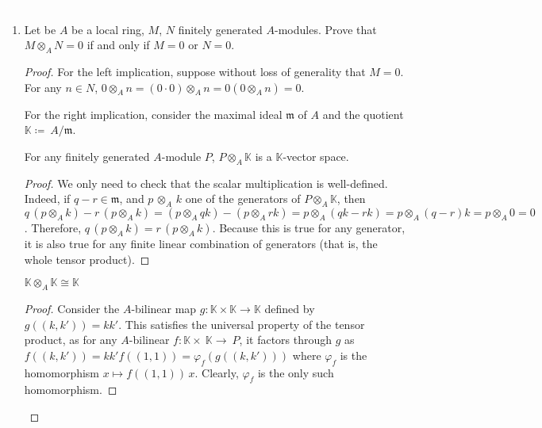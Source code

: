 \begin{problem}\textcolor{white}{.}

    \begin{enumerate}[label=(\theproblem.\arabic*),ref=\theproblem.\arabic*]
        \item Let be $A$ be a local ring, $M$, $N$ finitely generated $A$-modules.
        Prove that $M \otimes_A N = 0$ if and only if $M = 0$ or $N = 0$.
            \begin{sol}
                \begin{proof}
                    For the left implication, suppose without loss of generality that $M = 0$.
                    For any $n \in N$, $0 \otimes_A n = (0\cdot0) \otimes_A n = 0(0 \otimes_A n) = 0$.

                    For the right implication, consider the maximal ideal $\mathfrak{m}$ of $A$
                    and the quotient $\mathbb{K}\coloneqq~A/\mathfrak{m}$.
                    \begin{claim}
                        For any finitely generated $A$-module $P$, 
                        $P \otimes_A \mathbb{K}$ is a $\mathbb{K}$-vector space.
                        \begin{proof}
                            We only need to check that the scalar multiplication is well-defined.
                            Indeed, if $q-r \in \mathfrak{m}$, and $p\,\otimes_A\,k$ one of the generators of $P \otimes_A \mathbb{K}$,
                            then $q\,(p \otimes_A k) - r\,(p \otimes_A k) =
                            (p \otimes_A qk) - (p \otimes_A rk) =
                            p \otimes_A (qk - rk) =
                            p \otimes_A (q-r)k =
                            p \otimes_A 0 = 0$.
                            Therefore, $ q\,(p \otimes_A k) = r\,(p \otimes_A k)$.
                            Because this is true for any generator, it is also true for any finite linear combination of generators (that is, the whole tensor product).
                        \end{proof}
                    \end{claim}


                    \begin{claim}
                        $\mathbb{K} \otimes_{A} \mathbb{K} \cong \mathbb{K}$
                        \begin{proof}
                            Consider the $A$-bilinear map
                            $g\colon\mathbb{K}\times\mathbb{K}\to\mathbb{K}$
                            defined by $g((k, k')) = kk'$.
                            This satisfies the universal property of the tensor product,
                            as for any $A$-bilinear $f:\mathbb{K}\times~\mathbb{K}\to~P$,
                            it factors through $g$ as
                            $f((k, k'))=kk'f((1, 1))=\varphi_f(g((k,k')))$
                            where $\varphi_f$ is the homomorphism $x \mapsto f((1,1))\,x$.
                            Clearly, $\varphi_f$ is the only such homomorphism.
                        \end{proof}
                    \end{claim}


\end{proof}
\end{sol}
\end{enumerate}
\end{problem}
